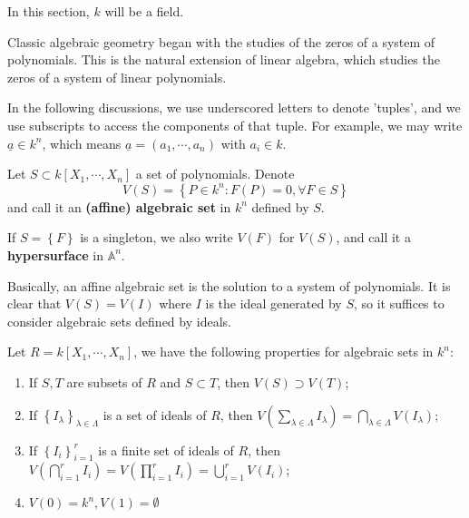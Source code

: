 \documentclass{note-eng}
\begin{document}
In this section, $k$ will be a field.

Classic algebraic geometry began with the studies of the zeros of a system of polynomials. This is the natural extension of linear algebra, which studies the zeros of a system of linear polynomials.

In the following discussions, we use underscored letters to denote 'tuples', and we use subscripts to access the components of that tuple. For example, we may write $\underline{a} \in k^n$, which means $\underline{a} = (a_1, \cdots, a_n)$ with $a_i \in k$.

\begin{definition}
    Let $S \subset k[X_1, \cdots, X_n]$ a set of polynomials. Denote
    $$V(S) = \left\lbrace P \in k^n: F(P) = 0, \forall F \in S \right\rbrace$$
    and call it an \textbf{(affine) algebraic set} in $k^n$ defined by $S$.

    If $S = \left\lbrace F \right\rbrace$ is a singleton, we also write $V(F)$ for $V(S)$, and call it a \textbf{hypersurface} in $\mathbb{A}^n$.
\end{definition}

Basically, an affine algebraic set is the solution to a system of polynomials. It is clear that $V(S) = V(I)$ where $I$ is the ideal generated by $S$, so it suffices to consider algebraic sets defined by ideals.

\begin{proposition}\label{prop:affine-algebraic-set-properties}
    Let $R = k[X_1, \cdots, X_n]$, we have the following properties for algebraic sets in $k^n$:
    \begin{enumerate}
        \item If $S, T$ are subsets of $R$ and $S \subset T$, then $V(S) \supset V(T)$;
        \item If $\left\lbrace I_\lambda \right\rbrace_{\lambda \in \Lambda}$ is a set of ideals of $R$, then $V\left(\sum\limits_{\lambda \in \Lambda} I_\lambda\right) = \bigcap\limits_{\lambda \in \Lambda} V(I_\lambda)$;
        \item If $\left\lbrace I_i \right\rbrace_{i = 1}^{r}$ is a finite set of ideals of $R$, then $V \left(\bigcap\limits_{i = 1}^{r} I_i\right) = V \left(\prod\limits_{i = 1}^{r} I_i\right) = \bigcup\limits_{i = 1}^{r} V(I_i)$;
        \item $V(0) = k^n, V(1) = \emptyset$
    \end{enumerate}
\end{proposition}
\end{document}
